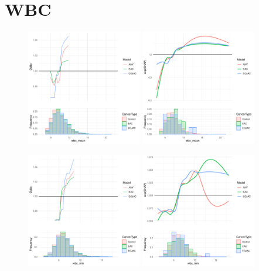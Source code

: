 \documentclass[12pt]{article}
\begin{document}
\newpage
\clearpage
\section{WBC}

\begin{figure}[h]
\centering
\includegraphics[width=0.45\textwidth]{pdp/wbc_mean.pdf}
\includegraphics[width=0.45\textwidth]{shap/wbc_mean.pdf}
\end{figure}
\begin{figure}[h]
\centering
\includegraphics[width=0.45\textwidth]{pdp/wbc_min.pdf}
\includegraphics[width=0.45\textwidth]{shap/wbc_min.pdf}
\end{figure}
\end{document}
